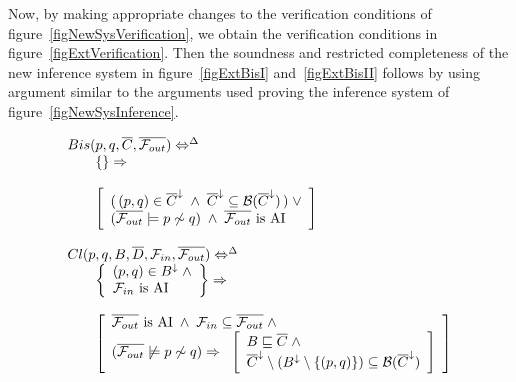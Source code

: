 Now, by making appropriate changes to the verification conditions of figure~\ref{figNewSysVerification}, we obtain the verification conditions in figure~\ref{figExtVerification}. Then the soundness and restricted completeness of the new inference system in figure~\ref{figExtBisI} and~\ref{figExtBisII} follows by using argument similar to the arguments used proving the inference system of figure~\ref{figNewSysInference}.
\begin{figure}
\begingroup\footnotesize
\[
\begin{array}{lll}
\multicolumn{3}{l}{Bis(p,q,\overline{C},\overline{{\cal F}_{out}}) \Leftrightarrow^{\Delta}}\\
&&\left\{\right\}\Rightarrow\\
\\
&&\left[
\begin{array}{l}
(\,(p,q)\in \overline{C}^{\downarrow}\;\wedge\; \overline{C}^{\downarrow}\subseteq{\cal B}(\overline{C}^{\downarrow})\,) \;\vee\\
(\overline{{\cal F}_{out}}\models p\not\sim q)\;\wedge\;\overline{{\cal F}_{out}}  \mbox{ is AI}
\end{array}
\right]\\
\\

\multicolumn{3}{l}{Cl(p,q,B,\overline{D},{\cal F}_{in},\overline{{\cal F}_{out}}) \Leftrightarrow^{\Delta}}\\
&&\left\{
\begin{array}{l}
(p,q)\in B^{\downarrow} \;\wedge\\
{\cal F}_{in} \mbox{ is AI}
\end{array}
\right\}\Rightarrow\\
\\
&&\left[
\begin{array}{l}
\overline{{\cal F}_{out}}  \mbox{ is AI} \;\wedge\;{\cal F}_{in}\subseteq\overline{{\cal F}_{out}}\; \wedge\\
(\overline{{\cal F}_{out}}\not\models p\not\sim q)\Rightarrow\;\;
\left[
\begin{array}{l}
B\sqsubseteq \overline{C}\; \wedge\\
\overline{C}^{\downarrow}\setminus (B^{\downarrow}\setminus \{(p,q)\})\subseteq {\cal B}(\overline{C}^{\downarrow})
\end{array}
\right]
\end{array}
\right]\\
\\


\end{array}\]
\end{figure}
